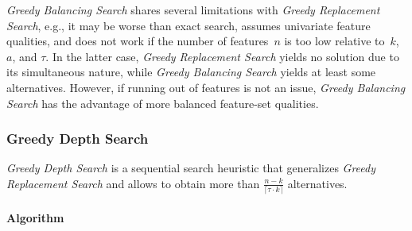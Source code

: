 \documentclass{article}
\theoremstyle{definition}
\begin{document}
\emph{Greedy Balancing Search} shares several limitations with \emph{Greedy Replacement Search}, e.g.,
it may be worse than exact search, assumes univariate feature qualities, and does not work if the number of features~$n$ is too low relative to~$k$, $a$, and $\tau$.
In the latter case, \emph{Greedy Replacement Search} yields no solution due to its simultaneous nature, while \emph{Greedy Balancing Search} yields at least some alternatives.
However, if running out of features is not an issue, \emph{Greedy Balancing Search} has the advantage of more balanced feature-set qualities.

\subsubsection{Greedy Depth Search}
\label{sec:afs:appendix:univariate-search:greedy-depth}

\emph{Greedy Depth Search} is a sequential search heuristic that generalizes \emph{Greedy Replacement Search} and allows to obtain more than $\frac{n - k}{\lceil \tau \cdot k \rceil}$ alternatives.

\paragraph{Algorithm}
\end{document}
